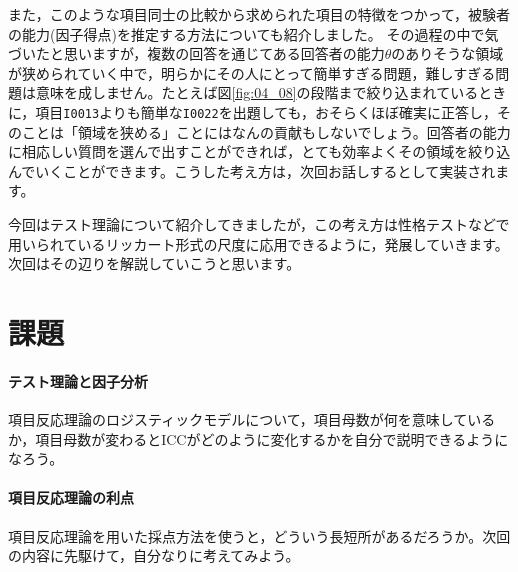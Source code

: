 \documentclass{ltjsbook}
\begin{document}
また，このような項目同士の比較から求められた項目の特徴をつかって，被験者の能力(因子得点)を推定する方法についても紹介しました。
その過程の中で気づいたと思いますが，複数の回答を通じてある回答者の能力$\theta$のありそうな領域が狭められていく中で，明らかにその人にとって簡単すぎる問題，難しすぎる問題は意味を成しません。たとえば図\ref{fig:04_08}の段階まで絞り込まれているときに，項目\texttt{I0013}よりも簡単な\texttt{I0022}を出題しても，おそらくほぼ確実に正答し，そのことは「領域を狭める」ことにはなんの貢献もしないでしょう。回答者の能力に相応しい質問を選んで出すことができれば，とても効率よくその領域を絞り込んでいくことができます。こうした考え方は，次回お話しするとして実装されます。

今回はテスト理論について紹介してきましたが，この考え方は性格テストなどで用いられているリッカート形式の尺度に応用できるように，発展していきます。次回はその辺りを解説していこうと思います。

\section{課題}
\paragraph{テスト理論と因子分析} 項目反応理論のロジスティックモデルについて，項目母数が何を意味しているか，項目母数が変わるとICCがどのように変化するかを自分で説明できるようになろう。
\paragraph{項目反応理論の利点} 項目反応理論を用いた採点方法を使うと，どういう長短所があるだろうか。次回の内容に先駆けて，自分なりに考えてみよう。
\end{document}
